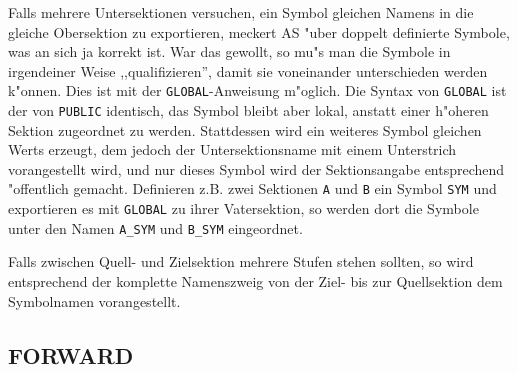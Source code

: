 \documentclass[12pt,a4paper,twoside]{report}
\newcommand{\tty}[1]{{\tt #1}}
\begin{document}
{\par
Falls mehrere Untersektionen versuchen, ein Symbol gleichen Namens
in die gleiche Obersektion zu exportieren, meckert AS "uber doppelt
definierte Symbole, was an sich ja korrekt ist.  War das gewollt,
so mu"s man die Symbole in irgendeiner Weise ,,qualifizieren'', damit
sie voneinander unterschieden werden k"onnen.  Dies ist mit der
\tty{GLOBAL}-Anweisung m"oglich.  Die Syntax von \tty{GLOBAL} ist
der von \tty{PUBLIC} identisch, das Symbol bleibt aber lokal, anstatt
einer h"oheren Sektion zugeordnet zu werden.  Stattdessen wird ein
weiteres Symbol gleichen Werts erzeugt, dem jedoch der Untersektionsname
mit einem Unterstrich vorangestellt wird, und nur dieses Symbol wird der
Sektionsangabe entsprechend "offentlich gemacht.  Definieren z.B. zwei
Sektionen \tty{A} und \tty{B} ein Symbol \tty{SYM} und exportieren
es mit  \tty{GLOBAL} zu ihrer Vatersektion, so werden dort die Symbole
unter den Namen \tty{A\_SYM} und \tty{B\_SYM} eingeordnet.
\par
Falls zwischen Quell- und Zielsektion mehrere Stufen stehen sollten,
so wird entsprechend der komplette Namenszweig von der Ziel- bis zur
Quellsektion dem Symbolnamen vorangestellt.


\subsection{FORWARD}

}
\end{document}
